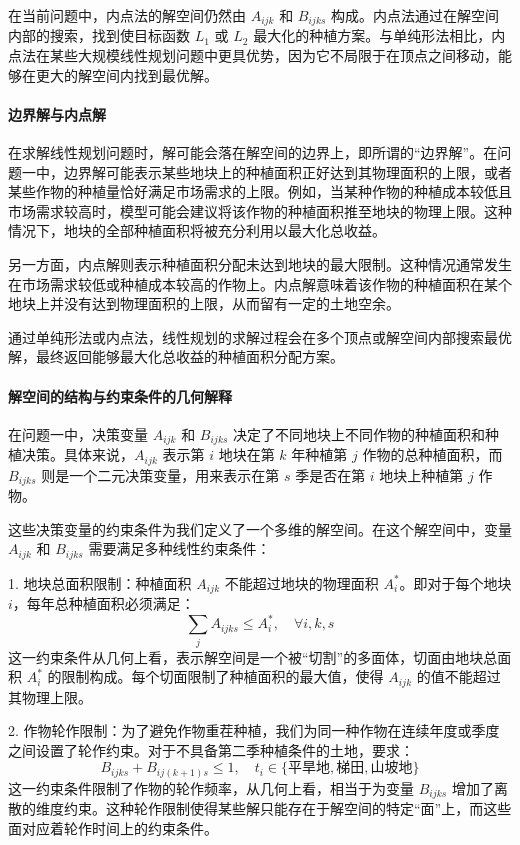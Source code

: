 \documentclass[12pt,a4paper]{nmmcm}
\begin{document}
在当前问题中，内点法的解空间仍然由 $A_{ijk}$ 和 $B_{ijks}$ 构成。内点法通过在解空间内部的搜索，找到使目标函数 $L_1$ 或 $L_2$ 最大化的种植方案。与单纯形法相比，内点法在某些大规模线性规划问题中更具优势，因为它不局限于在顶点之间移动，能够在更大的解空间内找到最优解。

\paragraph{边界解与内点解}

在求解线性规划问题时，解可能会落在解空间的边界上，即所谓的“边界解”。在问题一中，边界解可能表示某些地块上的种植面积正好达到其物理面积的上限，或者某些作物的种植量恰好满足市场需求的上限。例如，当某种作物的种植成本较低且市场需求较高时，模型可能会建议将该作物的种植面积推至地块的物理上限。这种情况下，地块的全部种植面积将被充分利用以最大化总收益。

另一方面，内点解则表示种植面积分配未达到地块的最大限制。这种情况通常发生在市场需求较低或种植成本较高的作物上。内点解意味着该作物的种植面积在某个地块上并没有达到物理面积的上限，从而留有一定的土地空余。

通过单纯形法或内点法，线性规划的求解过程会在多个顶点或解空间内部搜索最优解，最终返回能够最大化总收益的种植面积分配方案。


\paragraph{解空间的结构与约束条件的几何解释}

在问题一中，决策变量 $A_{ijk}$ 和 $B_{ijks}$ 决定了不同地块上不同作物的种植面积和种植决策。具体来说，$A_{ijk}$ 表示第 $i$ 地块在第 $k$ 年种植第 $j$ 作物的总种植面积，而 $B_{ijks}$ 则是一个二元决策变量，用来表示在第 $s$ 季是否在第 $i$ 地块上种植第 $j$ 作物。

这些决策变量的约束条件为我们定义了一个多维的解空间。在这个解空间中，变量 $A_{ijk}$ 和 $B_{ijks}$ 需要满足多种线性约束条件：

1. 地块总面积限制：种植面积 $A_{ijk}$ 不能超过地块的物理面积 $A_i^*$。即对于每个地块 $i$，每年总种植面积必须满足：
\[
  \sum_j A_{ijks} \leq A_i^*, \quad \forall i, k, s
\]
这一约束条件从几何上看，表示解空间是一个被“切割”的多面体，切面由地块总面积 $A_i^*$ 的限制构成。每个切面限制了种植面积的最大值，使得 $A_{ijk}$ 的值不能超过其物理上限。

2. 作物轮作限制：为了避免作物重茬种植，我们为同一种作物在连续年度或季度之间设置了轮作约束。对于不具备第二季种植条件的土地，要求：
\[
  B_{ijks} + B_{ij(k+1)s} \leq 1, \quad t_i \in \{\text{平旱地}, \text{梯田}, \text{山坡地}\}
\]
这一约束条件限制了作物的轮作频率，从几何上看，相当于为变量 $B_{ijks}$ 增加了离散的维度约束。这种轮作限制使得某些解只能存在于解空间的特定“面”上，而这些面对应着轮作时间上的约束条件。
\end{document}
